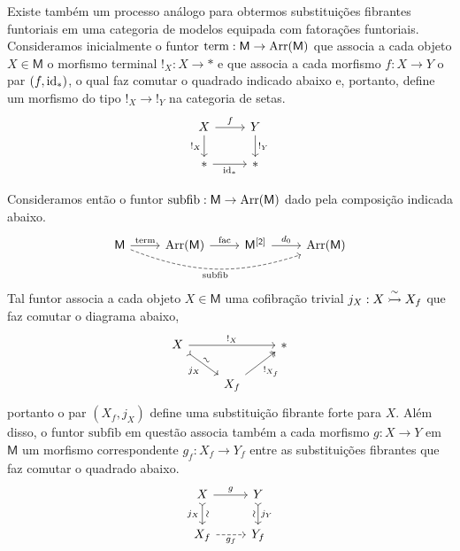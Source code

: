 \begin{obs}
  Existe também um processo análogo para obtermos substituições fibrantes funtoriais em uma categoria de modelos equipada com fatorações funtoriais.
  Consideramos inicialmente o funtor $\mathrm{term}: \mathsf{M} \to \mathrm{Arr}(\mathsf{M})$ que associa a cada objeto $X \in \mathsf{M}$ o morfismo terminal $!_{X}: X \to *$ e que associa a cada morfismo $f: X \to Y$ o par $(f,\mathrm{id}_{*})$, o qual faz comutar o quadrado indicado abaixo e, portanto, define um morfismo do tipo $!_{X} \to !_{Y}$ na categoria de setas.
  \begin{displaymath}
    \begin{tikzcd}
      X
      \arrow[r, "f"]
      \arrow[d, "!_{X}" swap]
      & Y
      \arrow[d, "!_{Y}"]
      \\ *
      \arrow[r, "\id_{*}" swap]
      & *
    \end{tikzcd}
  \end{displaymath}

  Consideramos então o funtor $\mathrm{subfib}: \mathsf{M} \to \mathrm{Arr}(\mathsf{M})$ dado pela composição indicada abaixo.
  \begin{displaymath}
    \begin{tikzcd}
      \mathsf{M}
      \arrow[r, "\mathrm{term}"]
      \arrow[rrr, dashed, bend right=20, "\mathrm{subfib}" swap]
      & \Arr(\mathsf{M})
      \arrow[r, "\mathrm{fac}"]
      & \mathsf{M^{[2]}}
      \arrow[r, "d_{0}"]
      & \Arr(\mathsf{M})
    \end{tikzcd}
  \end{displaymath}
  Tal funtor associa a cada objeto $X \in \mathsf{M}$ uma cofibração trivial $j_{X}: X \overset{\sim}{\rightarrowtail} X_{f}$ que faz comutar o diagrama abaixo,
  \begin{displaymath}
    \begin{tikzcd}
      X
      \arrow[rr, "!_{X}"]
      \arrow[rd, tail, "j_{X}" {swap}, "\sim" {sloped}]
      & & *
      \\ & X_{f}
      \arrow[ru, two heads, "!_{X_{f}}" swap]
    \end{tikzcd}
  \end{displaymath}
  portanto o par $(X_{f},j_{X})$ define uma substituição fibrante forte para $X$.
  Além disso, o funtor $\mathrm{subfib}$ em questão associa também a cada morfismo $g: X \to Y$ em $\mathsf{M}$ um morfismo correspondente $g_{f}: X_{f} \to Y_{f}$ entre as substituições fibrantes que faz comutar o quadrado abaixo.
  \begin{equation}\label{eq:funtorialidade_sub_fib}
    \begin{tikzcd}
      X
      \arrow[d, tail, "j_{X}" {swap}, "\sim" {sloped}]
      \arrow[r, "g"]
      & Y
      \arrow[d, tail, "j_{Y}", "\sim" {swap,sloped}]
      \\ X_{f}
      \arrow[r, dashed, "g_{f}" swap]
      & Y_{f}
    \end{tikzcd}
  \end{equation}


\end{obs}
